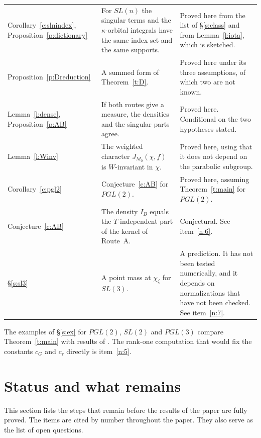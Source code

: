 \documentclass[12pt,letterpaper]{article}
\numberwithin{equation}{section}
\theoremstyle{plain}
\theoremstyle{definition}
\theoremstyle{remark}
\begin{document}
\begin{center}
\begin{tabular}{@{}>{\raggedright\arraybackslash}p{}>{\raggedright\arraybackslash}p{}>{\raggedright\arraybackslash}p{}@{}}
Corollary~\ref{c:slnindex}, Proposition~\ref{p:dictionary} & For $SL(n)$ the singular terms and the $\kappa$-orbital integrals have the same index set and the same supports. & Proved here from the list of \S\ref{s:class} and from Lemma~\ref{l:iota}, which is sketched.\\[0.5ex]
Proposition~\ref{p:Dreduction} & A summed form of Theorem~\ref{t:D}. & Proved here under its three assumptions, of which two are not known.\\[0.5ex]
Lemma~\ref{l:dense}, Proposition~\ref{p:AB} & If both routes give a measure, the densities and the singular parts agree. & Proved here. Conditional on the two hypotheses stated.\\[0.5ex]
Lemma~\ref{l:Winv} & The weighted character $J_{M_0}(\chi,f)$ is $W$-invariant in $\chi$. & Proved here, using that it does not depend on the parabolic subgroup.\\[0.5ex]
Corollary~\ref{c:pgl2} & Conjecture~\ref{c:AB} for $PGL(2)$. & Proved here, assuming Theorem~\ref{t:main} for $PGL(2)$.\\[0.5ex]
Conjecture~\ref{c:AB} & The density $I_B$ equals the $T$-independent part of the kernel of Route~A. & Conjectural. See item~\ref{n:6}.\\[0.5ex]
\S\ref{s:sl3} & A point mass at $\chi_\zeta$ for $SL(3)$. & A prediction. It has not been tested numerically, and it depends on normalizations that have not been checked. See item~\ref{n:7}.\\
\bottomrule
\end{tabular}
\end{center}

The examples of \S\ref{s:ex} for $PGL(2)$, $SL(2)$ and $PGL(3)$ compare Theorem~\ref{t:main} with results of \cite{JC26}. The rank-one computation that would fix the constants $c_G$ and $c_\tau$ directly is item~\ref{n:5}.

\section{Status and what remains}\label{s:status}

This section lists the steps that remain before the results of the paper are fully proved. The items are cited by number throughout the paper. They also serve as the list of open questions.
\end{document}

